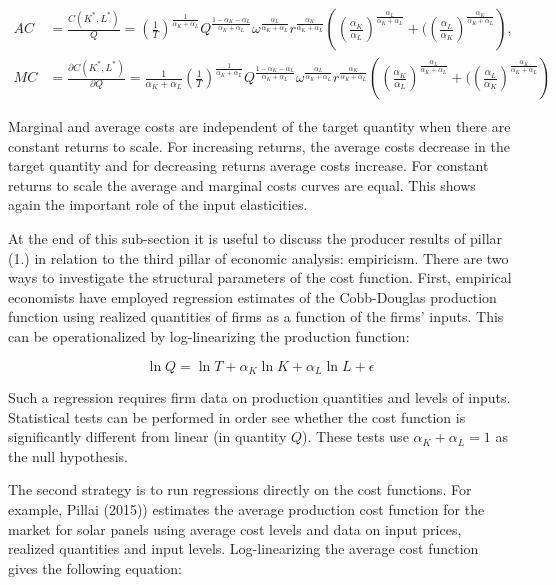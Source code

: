 \documentclass[
]{book}
\begin{document}
\begin{align}
AC &= \frac{C(K^\ast, L^\ast)}{Q} =\left(\frac{1}{T}\right)^{\frac{1}{\alpha_K + \alpha_L}}Q^{\frac{1- \alpha_K - \alpha_L}{\alpha_K + \alpha_L}} \omega^{\frac{\alpha_L}{\alpha_K + \alpha_L}} r^{\frac{\alpha_K}{\alpha_K + \alpha_L}}\left(\left(\frac{\alpha_K}{\alpha_L}\right)^{\frac{\alpha_L}{\alpha_K + \alpha_L}} + (\left(\frac{\alpha_L}{\alpha_K}\right)^{\frac{\alpha_K}{\alpha_K + \alpha_L}} \right), \\
MC &= \frac{\partial C(K^\ast, L^\ast)}{\partial Q} = \frac{1}{\alpha_K + \alpha_L}\left(\frac{1}{T}\right)^{\frac{1}{\alpha_K + \alpha_L}}Q^{\frac{1- \alpha_K - \alpha_L}{\alpha_K + \alpha_L}} \omega^{\frac{\alpha_L}{\alpha_K + \alpha_L}} r^{\frac{\alpha_K}{\alpha_K + \alpha_L}}\left(\left(\frac{\alpha_K}{\alpha_L}\right)^{\frac{\alpha_L}{\alpha_K + \alpha_L}} + (\left(\frac{\alpha_L}{\alpha_K}\right)^{\frac{\alpha_K}{\alpha_K + \alpha_L}} \right)
\end{align}

Marginal and average costs are independent of the target quantity when there are constant returns to scale. For increasing returns, the average costs decrease in the target quantity and for decreasing returns average costs increase. For constant returns to scale the average and marginal costs curves are equal. This shows again the important role of the input elasticities.

At the end of this sub-section it is useful to discuss the producer results of pillar (1.) in relation to the third pillar of economic analysis: empiricism. There are two ways to investigate the structural parameters of the cost function. First, empirical economists have employed regression estimates of the Cobb-Douglas production function using realized quantities of firms as a function of the firms' inputs. This can be operationalized by log-linearizing the production function:

\begin{equation}
\ln Q = \ln T + \alpha_K \ln K + \alpha_L \ln L + \epsilon
\end{equation}

Such a regression requires firm data on production quantities and levels of inputs. Statistical tests can be performed in order see whether the cost function is significantly different from linear (in quantity \(Q\)). These tests use \(\alpha_K + \alpha_L=1\) as the null hypothesis.

The second strategy is to run regressions directly on the cost functions. For example, Pillai (2015)) estimates the average production cost function for the market for solar panels using average cost levels and data on input prices, realized quantities and input levels. Log-linearizing the average cost function gives the following equation:
\end{document}
